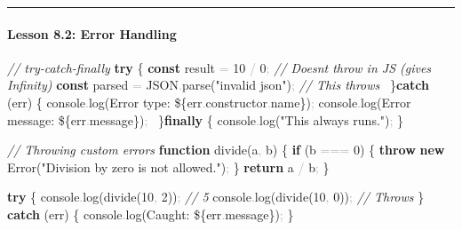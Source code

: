 \documentclass[
  justified,
  openright,
]{tufte-book}
\let\subsection\paragraph
\let\paragraph\paragraph
\newcommand{\KeywordTok}[1]{\textcolor{CodeKeyword}{\textbf{#1}}}  %
\newcommand{\StringTok}[1]{\textcolor{CodeString}{#1}}              %
\newcommand{\CommentTok}[1]{\textcolor{CodeComment}{\textit{#1}}}  %
\newcommand{\CodeNumTok}[1]{\textcolor{CodeNumber}{#1}}             %
\newcommand{\CodeFuncTok}[1]{\textcolor{CodeKeyword}{#1}}           %
\newcommand{\CodeTypeTok}[1]{\textcolor{CodeType}{#1}}              %
\newcommand{\OperatorTok}[1]{\textcolor{DarkGray}{#1}}              %
\newenvironment{Shaded}{%
  \begin{mdframed}[style=TufteCode]%
}{%
  \end{mdframed}%
}
\let\subsection\paragraph
\let\paragraph\paragraph
\begin{document}
\begin{center}\rule{0.5\linewidth}{0.5pt}\end{center}

\subsection{Lesson 8.2: Error Handling}\label{lesson-8.2-error-handling}

\begin{Shaded}
\begin{Highlighting}[]
\CommentTok{// try{-}catch{-}finally}
\KeywordTok{try} \{
  \KeywordTok{const} result \OperatorTok{=} \CodeNumTok{10} \OperatorTok{/} \CodeNumTok{0}\OperatorTok{;} \CommentTok{// Doesn\textquotesingle{}t throw in JS (gives Infinity)}
  \KeywordTok{const} parsed \OperatorTok{=} JSON\OperatorTok{.}\CodeFuncTok{parse}(\StringTok{"invalid json"})\OperatorTok{;} \CommentTok{// This throws}
\ \}\KeywordTok{catch} (err) \{
  console\OperatorTok{.}\CodeFuncTok{log}(\StringTok{\textasciigrave{}Error type: }\StringTok{\$\{}err\OperatorTok{.}\CodeTypeTok{constructor}\OperatorTok{.}\CodeTypeTok{name}\StringTok{\}}\StringTok{\textasciigrave{}})\OperatorTok{;}
  console\OperatorTok{.}\CodeFuncTok{log}(\StringTok{\textasciigrave{}Error message: }\StringTok{\$\{}err\OperatorTok{.}\CodeTypeTok{message}\StringTok{\}}\StringTok{\textasciigrave{}})\OperatorTok{;}
\ \}\KeywordTok{finally} \{
  console\OperatorTok{.}\CodeFuncTok{log}(\StringTok{"This always runs."})\OperatorTok{;}
\}
 
\CommentTok{// Throwing custom errors}
\KeywordTok{function} \CodeFuncTok{divide}(a\OperatorTok{,} b) \{
  \KeywordTok{if} (b \OperatorTok{===} \CodeNumTok{0}) \{
    \KeywordTok{throw} \KeywordTok{new} Error(\StringTok{"Division by zero is not allowed."})\OperatorTok{;}
  \}
  \KeywordTok{return} a \OperatorTok{/} b\OperatorTok{;}
\}
 
\KeywordTok{try} \{
  console\OperatorTok{.}\CodeFuncTok{log}(\CodeFuncTok{divide}(\CodeNumTok{10}\OperatorTok{,} \CodeNumTok{2}))\OperatorTok{;} \CommentTok{// 5}
  console\OperatorTok{.}\CodeFuncTok{log}(\CodeFuncTok{divide}(\CodeNumTok{10}\OperatorTok{,} \CodeNumTok{0}))\OperatorTok{;} \CommentTok{// Throws}
\} \KeywordTok{catch} (err) \{
  console\OperatorTok{.}\CodeFuncTok{log}(\StringTok{\textasciigrave{}Caught: }\StringTok{\$\{}err\OperatorTok{.}\CodeTypeTok{message}\StringTok{\}}\StringTok{\textasciigrave{}})\OperatorTok{;}
\}
\end{Highlighting}
\end{Shaded}
\end{document}
